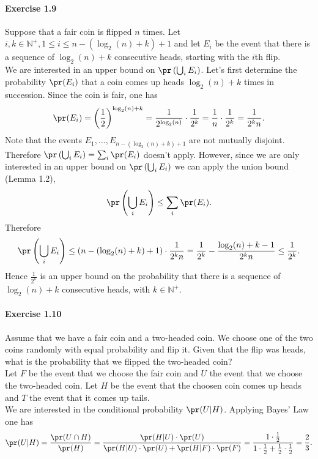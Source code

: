 \paragraph{Exercise 1.9} Suppose that a fair coin is flipped $n$ times. Let $i, k \in
\mathbb{N}^+, 1 \leq i \leq n - \left(\log_2(n) + k \right) + 1$ and let $E_i$ be the
event that there is a sequence of $\log_2(n) + k$ consecutive heads, starting with
the $i$th flip. \\
We are interested in an upper bound on $\pr\left(\bigcup_i E_i\right)$. Let's first
determine the probability $\pr(E_i)$ that a coin comes up heads $\log_2(n) + k$
times in succession. Since the coin is fair, one has
\[ \pr(E_i)
  = \left(\frac{1}{2}\right)^{\log_2(n) + k}
  = \frac{1}{2^{\log_2(n)}} \cdot \frac{1}{2^k}
  = \frac{1}{n} \cdot \frac{1}{2^k}
  = \frac{1}{2^k n}.
\]
Note that the events $E_1,...,E_{n - \left(\log_2(n) + k \right) + 1}$ are not
mutually disjoint. Therefore $\pr\left(\bigcup_i E_i\right) = \sum_i \pr(E_i)$
doesn't apply. However, since we are only interested in an upper bound on
$\pr\left(\bigcup_i E_i\right)$ we can apply the union bound (Lemma 1.2),
\[ \pr\left(\bigcup_i E_i\right) \leq \sum_i \pr(E_i). \]
Therefore
\[ \pr\left(\bigcup_i E_i\right)
  \leq \left(n - \left(\log_2(n) + k \right) + 1\right) \cdot \frac{1}{2^k n}
  = \frac{1}{2^k} - \frac{\log_2(n) + k - 1}{2^k n}
  \leq \frac{1}{2^k}.
\]
Hence $\frac{1}{2^k}$ is an upper bound on the probability that there is a
sequence of $\log_2(n) + k$ consecutive heads, with $k \in \mathbb{N}^+$.

\paragraph{Exercise 1.10} Assume that we have a fair coin and a two-headed coin.
We choose one of the two coins randomly with equal probability and flip it. Given
that the flip was heads, what is the probability that we flipped the two-headed coin? \\
Let $F$ be the event that we choose the fair coin and $U$ the event that we choose
the two-headed coin. Let $H$ be the event that the choosen coin comes up heads
and $T$ the event that it comes up tails. \\
We are interested in the conditional probability $\pr(U|H)$. Applying Bayes' Law
one has
\[ \pr(U|H)
    = \frac{\pr(U \cap H)}{\pr(H)}
    =\frac{\pr(H|U) \cdot \pr(U)}{\pr(H|U) \cdot \pr(U) + \pr(H|F) \cdot \pr(F)}
    =\frac{1 \cdot \frac{1}{2}}{1 \cdot \frac{1}{2} + \frac{1}{2} \cdot \frac{1}{2}}
    = \frac{2}{3}.
\]

